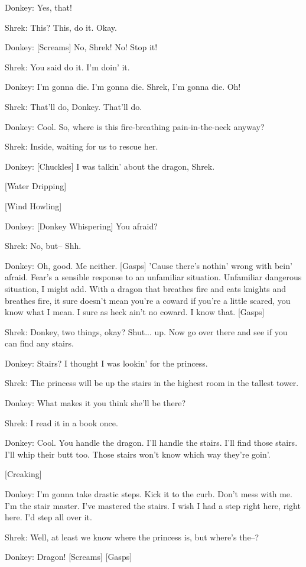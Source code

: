\documentclass{article}
\begin{document}
Donkey:
Yes, that!

Shrek:
This? This, do it. Okay.

Donkey:
[Screams] No, Shrek! No! Stop it!

Shrek:
You said do it. I'm doin' it.

Donkey:
I'm gonna die. I'm gonna die. Shrek, I'm gonna die. Oh!

Shrek:
That'll do, Donkey. That'll do.

Donkey:
Cool. So, where is this fire-breathing pain-in-the-neck anyway?

Shrek:
Inside, waiting for us to rescue her.

Donkey:
[Chuckles] I was talkin' about the dragon, Shrek.

[Water Dripping]

[Wind Howling]

Donkey:
[Donkey Whispering] You afraid?

Shrek:
No, but-- Shh.

Donkey:
Oh, good. Me neither. [Gasps] 'Cause there's nothin' wrong with bein' afraid. Fear's a sensible response to an unfamiliar situation. Unfamiliar dangerous situation, I might add. With a dragon that breathes fire and eats knights and breathes fire, it sure doesn't mean you're a coward if you're a little scared, you know what I mean. I sure as heck ain't no coward. I know that. [Gasps]

Shrek:
Donkey, two things, okay? Shut... up. Now go over there and see if you can find any stairs.

Donkey:
Stairs? I thought I was lookin' for the princess.

Shrek:
The princess will be up the stairs in the highest room in the tallest tower.

Donkey:
What makes it you think she'll be there?

Shrek:
I read it in a book once.

Donkey:
Cool. You handle the dragon. I'll handle the stairs. I'll find those stairs. I'll whip their butt too. Those stairs won't know which way they're goin'.

[Creaking]

Donkey:
I'm gonna take drastic steps. Kick it to the curb. Don't mess with me. I'm the stair master. I've mastered the stairs. I wish I had a step right here, right here. I'd step all over it.

Shrek:
Well, at least we know where the princess is, but where's the--?

Donkey:
Dragon! [Screams] [Gasps]
\end{document}

